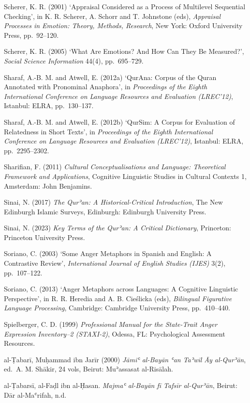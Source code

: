 \documentclass[11pt,a4paper]{article}
\begin{document}
Scherer, K. R. (2001) `Appraisal Considered as a Process of Multilevel
Sequential Checking', in K. R. Scherer, A. Schorr and T. Johnstone
(eds), \emph{Appraisal Processes in Emotion: Theory, Methods, Research},
New York: Oxford University Press, pp.~92--120.

Scherer, K. R. (2005) `What Are Emotions? And How Can They Be
Measured?', \emph{Social Science Information} 44(4), pp.~695--729.

Sharaf, A.-B. M. and Atwell, E. (2012a) `QurAna: Corpus of the Quran
Annotated with Pronominal Anaphora', in \emph{Proceedings of the Eighth
International Conference on Language Resources and Evaluation
(LREC'12)}, Istanbul: ELRA, pp.~130--137.

Sharaf, A.-B. M. and Atwell, E. (2012b) `QurSim: A Corpus for Evaluation
of Relatedness in Short Texts', in \emph{Proceedings of the Eighth
International Conference on Language Resources and Evaluation
(LREC'12)}, Istanbul: ELRA, pp.~2295--2302.

Sharifian, F. (2011) \emph{Cultural Conceptualisations and Language:
Theoretical Framework and Applications}, Cognitive Linguistic Studies in
Cultural Contexts 1, Amsterdam: John Benjamins.

Sinai, N. (2017) \emph{The Qurʾan: A Historical-Critical Introduction},
The New Edinburgh Islamic Surveys, Edinburgh: Edinburgh University
Press.

Sinai, N. (2023) \emph{Key Terms of the Qurʾan: A Critical Dictionary},
Princeton: Princeton University Press.

Soriano, C. (2003) `Some Anger Metaphors in Spanish and English: A
Contrastive Review', \emph{International Journal of English Studies
(IJES)} 3(2), pp.~107--122.

Soriano, C. (2013) `Anger Metaphors across Languages: A Cognitive
Linguistic Perspective', in R. R. Heredia and A. B. Cieślicka (eds),
\emph{Bilingual Figurative Language Processing}, Cambridge: Cambridge
University Press, pp.~410--440.

Spielberger, C. D. (1999) \emph{Professional Manual for the State-Trait
Anger Expression Inventory--2 (STAXI-2)}, Odessa, FL: Psychological
Assessment Resources.

al-Ṭabarī, Muḥammad ibn Jarīr (2000) \emph{Jāmiʿ al-Bayān ʿan Taʾwīl Āy
al-Qurʾān}, ed.~A. M. Shākir, 24 vols, Beirut: Muʾassasat al-Risālah.

al-Ṭabarsī, al-Faḍl ibn al-Ḥasan. \emph{Majmaʿ al-Bayān fī Tafsīr
al-Qurʾān}, Beirut: Dār al-Maʿrifah, n.d.
\end{document}
